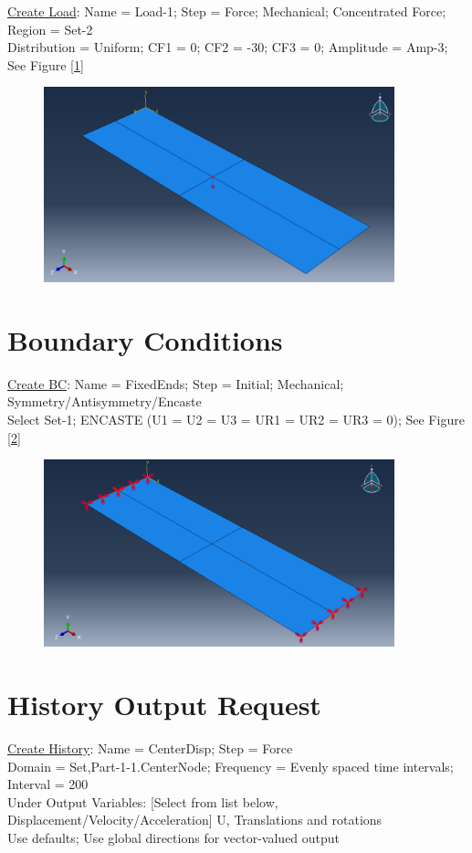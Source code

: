 \documentclass{article}
\begin{document}
	\underline{Create Load}: Name = Load-1; Step = Force; Mechanical; Concentrated Force; Region = Set-2\\
	Distribution = Uniform; CF1 = 0; CF2 = -30; CF3 = 0; Amplitude = Amp-3; See Figure [\ref{fig:load1}]
	\begin{figure}[H]
		\centering
		\includegraphics[width=4in]{Figures/load1.png}
		\caption{}
		\label{fig:load1}
	\end{figure}
	
	\section{Boundary Conditions}
	\underline{Create BC}: Name = FixedEnds; Step = Initial; Mechanical; Symmetry/Antisymmetry/Encaste\\
	Select Set-1; ENCASTE (U1 = U2 = U3 = UR1 = UR2 = UR3 = 0); See Figure [\ref{fig:fixed_ends}]
	\begin{figure}[H]
		\centering
		\includegraphics[width=4in]{Figures/fixed_ends.png}
		\caption{}
		\label{fig:fixed_ends}
	\end{figure}
	
	\section{History Output Request}
	\underline{Create History}: Name = CenterDisp; Step = Force\\
	Domain = Set,Part-1-1.CenterNode; Frequency = Evenly spaced time intervals; Interval = 200\\
	Under Output Variables: [Select from list below, Displacement/Velocity/Acceleration] U, Translations and rotations\\
	Use defaults; Use global directions for vector-valued output
	
\end{document}
